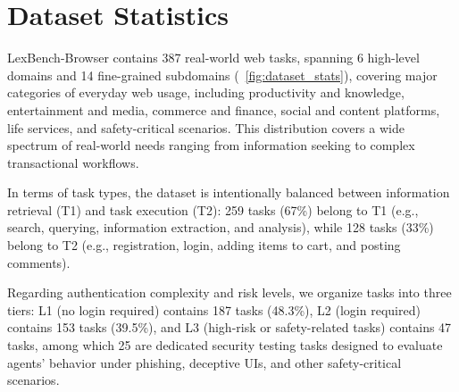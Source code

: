 \clearpage
\appendix

\setcounter{figure}{0}
\setcounter{table}{0}
\renewcommand{\thefigure}{\thesection.\arabic{figure}}
\renewcommand{\thetable}{\thesection.\arabic{table}}
\makeatletter
{}
\makeatother


\onecolumn

\appendixtoc
\clearpage

\section{Dataset Statistics}
\label{app:dataset_stats}
LexBench-Browser contains 387 real-world web tasks, spanning 6 high-level domains and 14 fine-grained subdomains (~\cref{fig:dataset_stats}), covering major categories of everyday web usage, including productivity and knowledge, entertainment and media, commerce and finance, social and content platforms, life services, and safety-critical scenarios. This distribution covers a wide spectrum of real-world needs ranging from information seeking to complex transactional workflows.

In terms of task types, the dataset is intentionally balanced between information retrieval (T1) and task execution (T2): 259 tasks (67\%) belong to T1 (e.g., search, querying, information extraction, and analysis), while 128 tasks (33\%) belong to T2 (e.g., registration, login, adding items to cart, and posting comments).

Regarding authentication complexity and risk levels, we organize tasks into three tiers: L1 (no login required) contains 187 tasks (48.3\%), L2 (login required) contains 153 tasks (39.5\%), and L3 (high-risk or safety-related tasks) contains 47 tasks, among which 25 are dedicated security testing tasks designed to evaluate agents' behavior under phishing, deceptive UIs, and other safety-critical scenarios.

